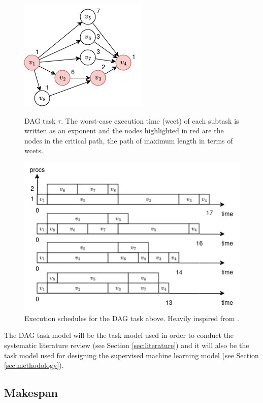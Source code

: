 \begin{figure}[htbp]
    \centering
    \includegraphics[width=0.5\linewidth]{images/example_DAG.png}
    \caption{DAG task $\tau$. The worst-case execution time (wcet) of each subtask is written as an exponent
    and the nodes highlighted in red are the nodes in the critical path, the path of maximum length in terms of wcets.}
    \label{fig:dag_example}
    \includegraphics[width=\linewidth]{images/example_DAG_schedules.png}
    \caption{Execution schedules for the DAG task above. Heavily inspired from \citet{zhao2020DAGsched}.}
    \label{fig:dag_schedule_example}
\end{figure}


The DAG task model will be the task model used in order to conduct 
the systematic literature review (see Section \ref{sec:literature})
and it will also be the task model used for designing 
the supervised machine learning model (see Section \ref{sec:methodology}).

\subsection{Makespan}

